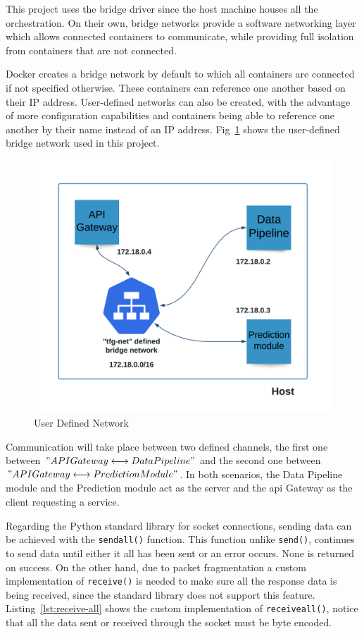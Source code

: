 This project uses the bridge driver since the host machine houses all the orchestration. On their own, bridge networks provide a software networking layer which allows connected containers to communicate, while providing full isolation from containers that are not connected.

Docker creates a bridge network by default to which all containers are connected if not specified otherwise. These containers can reference one another based on their IP address. User-defined networks can also be created, with the advantage of more configuration capabilities and containers being able to reference one another by their name instead of an IP address. Fig~\ref{fig:tfg-net} shows the user-defined bridge network used in this project.

\begin{figure}[h]
    \centering
    \includegraphics[width=\textwidth]{figures/tfg-net.png}
     \caption{User Defined Network}
    \label{fig:tfg-net}
\end{figure}

Communication will take place between two defined channels, the first one between $"API Gateway \longleftrightarrow Data Pipeline"$ and the second one between $"API Gateway \longleftrightarrow Prediction Module"$. In both scenarios, the Data Pipeline module and the Prediction module act as the server and the \gls{api} Gateway as the client requesting a service. 

Regarding the Python standard library for socket connections, sending data can be achieved with the \lstinline[language=python]{sendall()} function. This function unlike \lstinline[language=python]{send()}, continues to send data until either it all has been sent or an error occurs. None is returned on success. On the other hand, due to packet fragmentation a custom implementation of \lstinline[language=python]{receive()} is needed to make sure all the response data is being received, since the standard library does not support this feature. Listing~\ref{lst:receive-all} shows the custom implementation of \lstinline[language=python]{receiveall()}, notice that all the data sent or received through the socket must be byte encoded.\\

